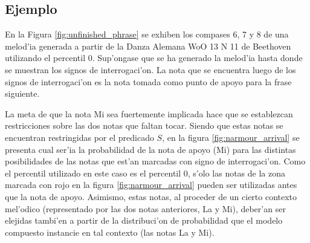 \subsection{Ejemplo}
En la Figura \ref{fig:unfinished_phrase} se exhiben los compases 6, 7 y 8 de una melod'ia generada a partir de la Danza Alemana WoO 13 N 11 
de Beethoven utilizando el percentil 0. Sup'ongase que se ha generado la melod'ia hasta donde se muestran los signos de interrogaci'on. 
La nota que se encuentra luego de los signos de interrogaci'on es la nota tomada como punto de apoyo para la frase siguiente.

\begin{imagen}
    \width{5cm}
\end{imagen}

La meta de que la nota Mi sea fuertemente implicada hace que se establezcan restricciones sobre las dos notas que faltan tocar. 
Siendo que estas notas se encuentran restringidas por el predicado $S$, en la figura \ref{fig:narmour_arrival} se presenta cual ser'ia 
la probabilidad de la nota de apoyo (Mi) para las distintas posibilidades de las notas que est'an marcadas con signo de interrogaci'on. 
Como el percentil utilizado en este caso es el percentil 0, s'olo las notas de la zona marcada con rojo en la figura \ref{fig:narmour_arrival}
pueden ser utilizadas antes que la nota de apoyo. Asimismo, estas notas, al proceder de un cierto contexto mel'odico 
(representado por las dos notas anteriores, La y Mi), deber'an ser elejidas tambi'en a partir de la distribuci'on de probabilidad 
que el modelo compuesto instancie en tal contexto (las notas La y Mi). 

\begin{imagen}
    \width{13cm}
\end{imagen}

\begin{imagen}
    \width{13cm}
\end{imagen}

